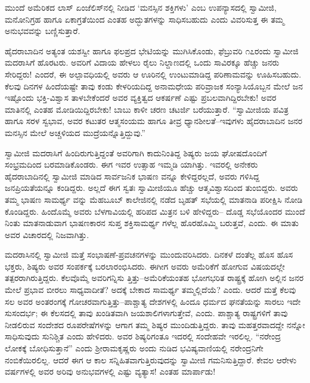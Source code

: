 ಮುಂದೆ ಅಮೆರಿಕದ ಲಾಸ್ ಏಂಜೆಲಿಸ್​ನಲ್ಲಿ ನೀಡಿದ ‘ಮನಸ್ಸಿನ ಶಕ್ತಿಗಳು’ ಎಂಬ ಉಪನ್ಯಾಸದಲ್ಲಿ ಸ್ವಾಮೀಜಿ, ಮನೋನಿಗ್ರಹ ಹಾಗೂ ಏಕಾಗ್ರತೆಯಿಂದ ಎಂತಹ ಅದ್ಭುತಗಳನ್ನು ಸಾಧಿಸಬಹುದು ಎಂದು ವಿವರಿಸುತ್ತ ಈ ತಮ್ಮ ಅನುಭವವನ್ನು ಬಣ್ಣಿಸುತ್ತಾರೆ.

ಹೈದರಾಬಾದಿನ ಅತ್ಯಂತ ಯಶಸ್ವೀ ಹಾಗೂ ಫಲಪ್ರದ ಭೇಟಿಯನ್ನು ಮುಗಿಸಿಕೊಂಡು, ಫೆಬ್ರುವರಿ ೧೭ರಂದು ಸ್ವಾಮೀಜಿ ಮದರಾಸಿಗೆ ಹೊರಟರು. ಅವರಿಗೆ ವಿದಾಯ ಹೇಳಲು ರೈಲು ನಿಲ್ದಾಣದಲ್ಲಿ ಒಂದು ಸಾವಿರಕ್ಕೂ ಹೆಚ್ಚು ಜನರು ಸೇರಿದ್ದರು! ಎಂದರೆ, ಈ ಅಲ್ಪಾವಧಿಯಲ್ಲಿ ಅವರು ಆ ಊರಿನಲ್ಲಿ ಉಂಟುಮಾಡಿದ್ದ ಪರಿಣಾಮವನ್ನು ಊಹಿಸಬಹುದು. ಕೆಲವು ದಿನಗಳ ಹಿಂದೆಯಷ್ಟೇ ತಾವು ಕಂಡು ಕೇಳರಿಯದಿದ್ದ ಅನಾಮಧೇಯ ಪರಿವ್ರಾಜಕ ಸಂನ್ಯಾಸಿಯೊಬ್ಬನ ಮೇಲೆ ಜನ ಇಷ್ಟೊಂದು ಭಕ್ತಿ-ವಿಶ್ವಾಸ ತಾಳಬೇಕೆಂದರೆ ಅವರ ವ್ಯಕ್ತಿತ್ವದ ಆಕರ್ಷಣೆ ಎಷ್ಟು ಪ್ರಬಲವಾಗಿದ್ದಿರಬೇಕು! ಅವರ ಮಾತಿನಲ್ಲಿ ಎಂತಹ ಮೋಡಿಯಿದ್ದಿರಬೇಕು! ಬಾಬು ಕಾಳೀ ಚರಣ ಚಟರ್ಜಿ ಬರೆಯುತ್ತಾರೆ. “ಸ್ವಾಮೀಜಿಯ ಪವಿತ್ರ ಹಾಗೂ ಸರಳ ಸ್ವಭಾವ, ಅವರ ಕಟುತರ ಆತ್ಮಸಂಯಮ ಹಾಗೂ ತೀವ್ರ ಧ್ಯಾನಶೀಲತೆ–ಇವುಗಳು ಹೈದರಾಬಾದಿನ ಜನರ ಮನಸ್ಸಿನ ಮೇಲೆ ಅಚ್ಚಳಿಯದ ಮುದ್ರೆಯನ್ನೊತ್ತಿದ್ದುವು.”

ಸ್ವಾಮೀಜಿ ಮದರಾಸಿಗೆ ಹಿಂದಿರುಗುತ್ತಿದ್ದಂತೆ ಅವರಿಗಾಗಿ ಕಾದುನಿಂತಿದ್ದ ಶಿಷ್ಯರು ಜಯ ಘೋಷದೊಂದಿಗೆ ಸಂಭ್ರಮದಿಂದ ಬರಮಾಡಿಕೊಂಡರು. ಈಗ ಇವರ ಉತ್ಸಾಹ ಇಮ್ಮಡಿ ಯಾಗಿತ್ತು. ಇವರಲ್ಲಿ ಅನೇಕರು ಹೈದರಾಬಾದಿನಲ್ಲಿ ಸ್ವಾಮೀಜಿ ಮಾಡಿದ ಸಾರ್ವಜನಿಕ ಭಾಷಣ ವನ್ನೂ ಕೇಳಿದ್ದರಲ್ಲದೆ, ಅವರು ಗಳಿಸಿದ್ದ ಜನಪ್ರಿಯತೆಯನ್ನೂ ಕಂಡಿದ್ದರು. ಅಲ್ಲದೆ ಈಗ ಸ್ವತಃ ಸ್ವಾಮೀಜಿಯೂ ಹೆಚ್ಚು ಆತ್ಮವಿಶ್ವಾಸದಿಂದ ತುಂಬಿದ್ದರು. ಅವರು ತಮ್ಮ ಭಾಷಣ ಸಾಮರ್ಥ್ಯ ವನ್ನು ಮೆಹಬೂಬ್ ಕಾಲೇಜಿನಲ್ಲಿ ನಡೆದ ಬೃಹತ್ ಸಭೆಯಲ್ಲಿ ಮಾತನಾಡಿ ಪರೀಕ್ಷಿಸಿ ನೋಡಿ ಕೊಂಡಿದ್ದರು. ಹಿಂದೊಮ್ಮೆ ಅವರು ಬೆಳಗಾವಿಯಲ್ಲಿ ಹರಿಪದ ಮಿತ್ರನ ಬಳಿ ಹೇಳಿದ್ದರು– ದೊಡ್ಡ ಸಭೆಯೊಂದರ ಮುಂದೆ ನಿಂತು ಮಾತನಾಡುವಾಗ ಭಾಷಣಕಾರನ ಸುಪ್ತ ಶಕ್ತಿಸಾಮರ್ಥ್ಯ ಗಳೆಲ್ಲ ಹೊರಹೊಮ್ಮಿ ಬರುತ್ತವೆ, ಎಂದು. ಈ ಮಾತು ಅವರ ವಿಚಾರದಲ್ಲಿ ನಿಜವಾಗಿತ್ತು.

ಮದರಾಸಿನಲ್ಲಿ ಸ್ವಾಮೀಜಿ ಮತ್ತೆ ಸಂಭಾಷಣೆ-ಪ್ರವಚನಗಳನ್ನು ಮುಂದುವರಿಸಿದರು. ದಿನಕಳೆ ದಂತೆಲ್ಲ ಹೊಸ ಹೊಸ ಭಕ್ತರು, ಶಿಷ್ಯರು ಅವರ ಸಂಪರ್ಕಕ್ಕೆ ಬರಲಾರಂಭಿಸಿದರು. ಈಗೀಗ ಅವರು ಅಮೆರಿಕೆಗೆ ಹೋಗುವ ವಿಷಯದಲ್ಲೇ ತತ್ಪರರಾಗಿರುತ್ತಿದ್ದರು. ಕೆಲವೊಮ್ಮೆ ಅವರಿಗನ್ನಿಸು ತ್ತಿತ್ತು–ಅಮೆರಿಕೆಯಂತಹ ಭೋಗಭರಿತ ರಾಷ್ಟ್ರಕ್ಕೆ ಹೋಗಿ ಅಲ್ಲಿನ ಜನರ ಮೇಲೆ ಪ್ರಭಾವ ಬೀರಲು ಸಾಧ್ಯವಾದೀತೆ? ಅದಕ್ಕೆ ಬೇಕಾದ ಸಾಮರ್ಥ್ಯ ತಮ್ಮಲ್ಲಿದೆಯೆ? ಎಂದು. ಆದರೆ ಮತ್ತೆ ಕೆಲವು ಸಲ ಅವರ ಅಂತರಂಗಕ್ಕೆ ಗೋಚರವಾಗುತ್ತಿತ್ತು–ಪಾಶ್ಚಾತ್ಯ ದೇಶಗಳಲ್ಲಿ ಹಿಂದೂ ಧರ್ಮದ ಘನತೆಯನ್ನು ಸಾರಲು ಇದೇ ಸುಸಂದರ್ಭ; ಈ ಕೆಲಸದಲ್ಲಿ ತಾವು ಖಂಡಿತವಾಗಿ ಜಯಶಾಲಿಗಳಾಗುತ್ತೇವೆ, ಎಂದು. ಪಾಶ್ಚಾತ್ಯ ರಾಷ್ಟ್ರಗಳಿಗೆ ತಾವು ನೀಡಲಿರುವ ಸಂದೇಶದ ರೂಪರೇಷೆಗಳನ್ನು ಆಗಾಗ ತಮ್ಮ ಶಿಷ್ಯರ ಮುಂದಿಡುತ್ತಿದ್ದರು. ತಾವು ಮಹತ್ತರವಾದದ್ದೇ ನನ್ನೋ ಸಾಧಿಸುವುದು ಸುನಿಶ್ಚಿತ ಎಂದು ಹೇಳಿದರು. ಅವರ ಶಿಷ್ಯರಿಗಂತೂ ಇದರಲ್ಲಿ ಸಂದೇಹವೇ ಇರಲಿಲ್ಲ. “ನರೇಂದ್ರ ಲೋಕಕ್ಕೆ ಬೋಧಿಸುತ್ತಾನೆ” ಎಂದು ಶ್ರೀರಾಮಕೃಷ್ಣರು ಅಂದು ನುಡಿದ ಭವಿಷ್ಯವಾಣಿಯಲ್ಲಿ ನರೇಂದ್ರನಿಗೇ ನಂಬಿಕೆಯಿರಲಿಲ್ಲ. ಆದರೆ ಈಗ ಆ ಕಾಲ ಸನ್ನಿಹಿತವಾಗುತ್ತಿರುವುದನ್ನು ಸ್ವಾಮೀಜಿ ಗಮನಿಸುತ್ತಿದ್ದಾರೆ. ಕೇವಲ ಆರೇಳು ವರ್ಷಗಳಲ್ಲಿ ಅವರ ಅರಿವು ಅನುಭವಗಳಲ್ಲಿ ಎಷ್ಟು ವ್ಯತ್ಯಾಸ! ಎಂತಹ ಮಾರ್ಪಾಡು!

